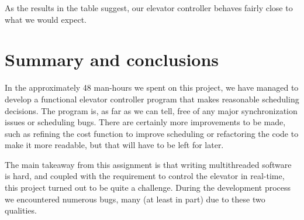 \documentclass[a4paper]{article}
\begin{document}
As the results in the table suggest, our elevator controller behaves fairly
close to what we would expect.

\section{Summary and conclusions}

In the approximately 48 man-hours we spent on this project, we have managed to
develop a functional elevator controller program that makes reasonable
scheduling decisions. The program is, as far as we can tell, free of any major
synchronization issues or scheduling bugs. There are certainly more improvements
to be made, such as refining the cost function to improve scheduling or
refactoring the code to make it more readable, but that will have to be left for
later.

The main takeaway from this assignment is that writing multithreaded software is
hard, and coupled with the requirement to control the elevator in real-time,
this project turned out to be quite a challenge. During the development process
we encountered numerous bugs, many (at least in part) due to these two
qualities.
\end{document}
